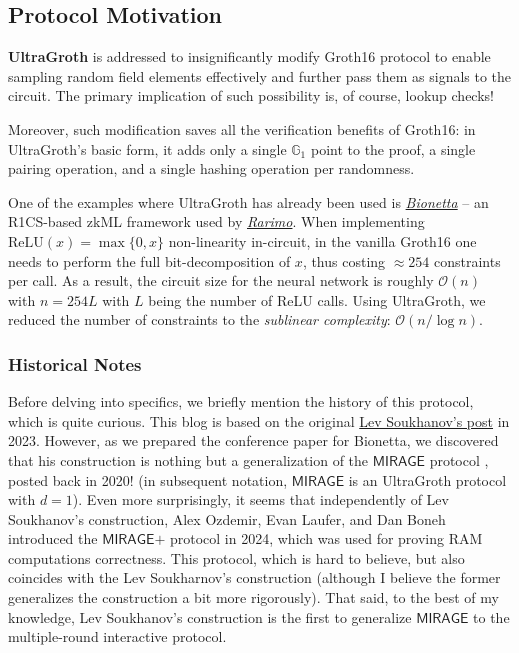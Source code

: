 
\subsection{Protocol Motivation}

\textbf{UltraGroth} is addressed to insignificantly modify Groth16 protocol to
enable sampling random field elements effectively and further pass them as
signals to the circuit. The primary implication of such possibility is, of
course, lookup checks!

Moreover, such modification saves all the verification benefits of Groth16: in
UltraGroth's basic form, it adds only a single $\mathbb{G}_1$ point to the
proof, a single pairing operation, and a single hashing operation per
randomness. 

One of the examples where UltraGroth has already been used is
\href{https://mirror.xyz/0x90699B5A52BccbdFe73d5c9F3d039a33fb2D1AF6/T4lHiBlo7VoYp-5SEuitQnY7_ullpwkZbanOOwjeZI4}{\textit{Bionetta}}
-- an R1CS-based zkML framework used by
\href{https://rarimo.com/}{\textit{Rarimo}}. When implementing
$\text{ReLU}(x)=\max\{0,x\}$ non-linearity in-circuit, in the vanilla Groth16
one needs to perform the full bit-decomposition of $x$, thus costing $\approx
254$ constraints per call. As a result, the circuit size for the neural network
is roughly $\mathcal{O}(n)$ with $n=254L$ with $L$ being the number of ReLU
calls. Using UltraGroth, we reduced the number of constraints to the
\textit{sublinear complexity}: $\mathcal{O}(n/\log n)$.

\subsubsection{Historical Notes}

Before delving into specifics, we briefly mention the history of this protocol,
which is quite curious. This blog is based on the original
\href{https://hackmd.io/@Merlin404/Hy_O2Gi-h}{Lev Soukhanov's post} in 2023.
However, as we prepared the conference paper for Bionetta, we discovered that
his construction is nothing but a generalization of
the $\textsf{MIRAGE}$ protocol \cite{mirage}, posted back
in 2020! (in subsequent notation, $\textsf{MIRAGE}$ is an UltraGroth protocol
with $d=1$). Even more surprisingly, it seems that independently of Lev
Soukhanov's construction, Alex Ozdemir, Evan Laufer, and Dan Boneh introduced
the $\textsf{MIRAGE+}$ protocol \cite{mirageplus} in 2024,
which was used for proving RAM computations correctness. This protocol, which is
hard to believe, but also coincides with the Lev Soukharnov's construction
(although I believe the former generalizes the construction a bit more
rigorously). That said, to the best of my knowledge, Lev Soukhanov's
construction is the first to generalize $\textsf{MIRAGE}$ to the multiple-round
interactive protocol.

